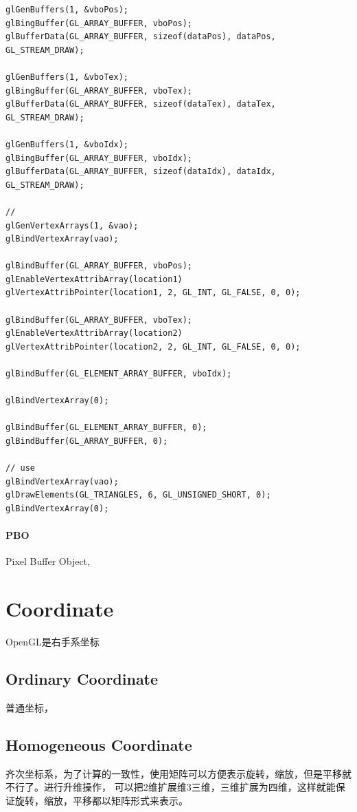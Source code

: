 \begin{lstlisting}
glGenBuffers(1, &vboPos);
glBingBuffer(GL_ARRAY_BUFFER, vboPos);
glBufferData(GL_ARRAY_BUFFER, sizeof(dataPos), dataPos, GL_STREAM_DRAW);

glGenBuffers(1, &vboTex);
glBingBuffer(GL_ARRAY_BUFFER, vboTex);
glBufferData(GL_ARRAY_BUFFER, sizeof(dataTex), dataTex, GL_STREAM_DRAW);

glGenBuffers(1, &vboIdx);
glBingBuffer(GL_ARRAY_BUFFER, vboIdx);
glBufferData(GL_ARRAY_BUFFER, sizeof(dataIdx), dataIdx, GL_STREAM_DRAW);

// 
glGenVertexArrays(1, &vao);
glBindVertexArray(vao);

glBindBuffer(GL_ARRAY_BUFFER, vboPos);
glEnableVertexAttribArray(location1)
glVertexAttribPointer(location1, 2, GL_INT, GL_FALSE, 0, 0);

glBindBuffer(GL_ARRAY_BUFFER, vboTex);
glEnableVertexAttribArray(location2)
glVertexAttribPointer(location2, 2, GL_INT, GL_FALSE, 0, 0);

glBindBuffer(GL_ELEMENT_ARRAY_BUFFER, vboIdx);

glBindVertexArray(0);

glBindBuffer(GL_ELEMENT_ARRAY_BUFFER, 0);
glBindBuffer(GL_ARRAY_BUFFER, 0);

// use 
glBindVertexArray(vao);
glDrawElements(GL_TRIANGLES, 6, GL_UNSIGNED_SHORT, 0);
glBindVertexArray(0);
\end{lstlisting}

\paragraph{PBO}

Pixel Buffer Object, 

\section{Coordinate}

OpenGL是右手系坐标

\subsection{Ordinary Coordinate}
普通坐标，

\subsection{Homogeneous Coordinate}
齐次坐标系，为了计算的一致性，使用矩阵可以方便表示旋转，缩放，但是平移就不行了。进行升维操作，
可以把2维扩展维3三维，三维扩展为四维，这样就能保证旋转，缩放，平移都以矩阵形式来表示。

